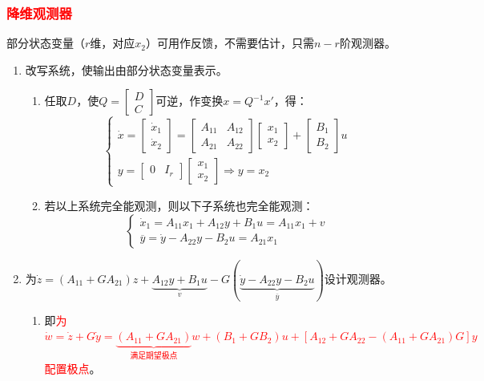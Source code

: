 \documentclass[
12pt, %
a4paper, 
oneside, %
]{scrartcl}
\begin{document}
\subsubsection[降维观测器]{\textcolor{red}{降维观测器}}
部分状态变量（$ r $维，对应$ x_2 $）可用作反馈，不需要估计，只需$ n - r $阶观测器。
\begin{enumerate}
\item 改写系统，使输出由部分状态变量表示。
\begin{enumerate}
\item 任取$ D $，使$ Q = \begin{bmatrix} D \\ C \end{bmatrix} $可逆，作变换$ x = Q^{-1} x' $，得：
$$ \begin{cases} \dot{x} = \begin{bmatrix} \dot{x}_1 \\ \dot{x}_2 \end{bmatrix} = \begin{bmatrix} A_{11} & A_{12} \\ A_{21} & A_{22} \end{bmatrix} \begin{bmatrix} x_1 \\ x_2 \end{bmatrix} + \begin{bmatrix} B_1 \\ B_2 \end{bmatrix} u \\ y = \begin{bmatrix} 0 & I_r \end{bmatrix} \begin{bmatrix} x_1 \\ x_2 \end{bmatrix} \Rightarrow y = x_2 \end{cases} $$
\item 若以上系统完全能观测，则以下子系统也完全能观测：
$$ \begin{cases} \dot{x}_1 = A_{11} x_1 + A_{12} y + B_1 u = A_{11} x_1 + v \\ \overline{y} = \dot{y} - A_{22} y - B_2 u = A_{21} x_1 \end{cases} $$
\end{enumerate}
\item 为$ \dot{z} = (A_{11} + G A_{21}) z + \underbrace{A_{12} y + B_1 u}_{v} - G(\underbrace{\dot{y} - A_{22} y - B_2 u}_{\overline{y}}) $设计观测器。
\begin{enumerate}
\item 即\textcolor{red}{为$ \dot{w} = \dot{z} + G \dot{y} = \underbrace{(A_{11} + G A_{21})}_{\text{满足期望极点}} w + (B_1 + G B_2)u + [A_{12} + G A_{22} - (A_{11} + G A_{21})G]y $配置极点}。

\end{enumerate}
\end{enumerate}
\end{document}
